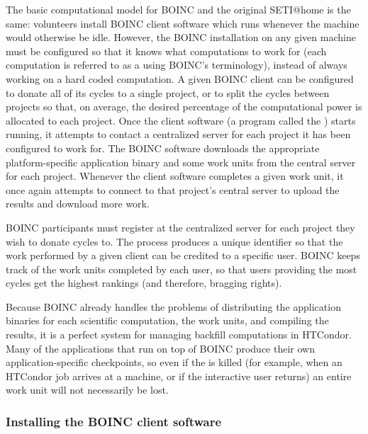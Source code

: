 The basic computational model for BOINC and the original SETI@home is
the same: volunteers install BOINC client software which runs
whenever the machine would otherwise be idle.
However, the BOINC installation on any given machine must be
configured so that it knows what computations to work for (each
computation is referred to as a  using BOINC's
terminology), instead of always working on a hard coded computation.
A given BOINC client can be configured to donate all of its cycles to
a single project, or to split the cycles between projects so that, on
average, the desired percentage of the computational power is
allocated to each project.
Once the client software (a program called the )
starts running, it attempts to contact a centralized server for
each project it has been configured to work for.
The BOINC software downloads the appropriate platform-specific
application binary and some work units from the central server for
each project.
Whenever the client software completes a given work unit, it once
again attempts to connect to that project's central server to upload
the results and download more work.

BOINC participants must register at the centralized server for each
project they wish to donate cycles to.
The process produces a unique identifier so that the work performed by
a given client can be credited to a specific user.
BOINC keeps track of the work units completed by each user, so that
users providing the most cycles get the highest rankings (and
therefore, bragging rights).

Because BOINC already handles the problems of distributing the
application binaries for each scientific computation, the work units,
and compiling the results, it is a perfect system for managing
backfill computations in HTCondor.
Many of the applications that run on top of BOINC produce their own
application-specific checkpoints, so even if the
 is killed (for example, when an HTCondor job arrives
at a machine, or if the interactive user returns) an entire work unit
will not necessarily be lost.


\subsubsection{\label{sec:Backfill-BOINC-install}Installing the BOINC client
software}

